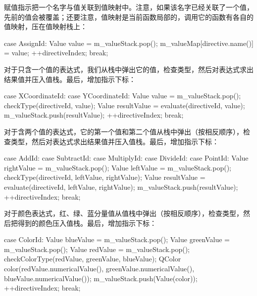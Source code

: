 赋值指示把一个名字与值关联到值映射中。注意，如果该名字已经关联了一个值，先前的值会被覆盖；还要注意，值映射是当前函数局部的，调用它的函数有各自的值映射，压在值映射栈上：

\begin{codebox}
      case AssignId: {
          Value value = m_valueStack.pop();
          m_valueMap[directive.name()] = value;
          ++directiveIndex;
        }
        break;
\end{codebox}

对于只含一个值的表达式，我们从栈中弹出它的值，检查类型，然后对表达式求出结果值并压入值栈。最后，增加指示下标：

\begin{codebox}
      case XCoordinateId:
      case YCoordinateId: {
          Value value = m_valueStack.pop();
          checkType(directiveId, value);
          Value resultValue = evaluate(directiveId, value);
          m_valueStack.push(resultValue);
          ++directiveIndex;
        }
        break;
\end{codebox}

对于含两个值的表达式，它的第一个值和第二个值从栈中弹出（按相反顺序），检查类型，然后对表达式求出结果值并压入值栈。最后，增加指示下标：

\begin{codebox}
      case AddId:
      case SubtractId:
      case MultiplyId:
      case DivideId:
      case PointId: {
          Value rightValue = m_valueStack.pop();
          Value leftValue = m_valueStack.pop();
          checkType(directiveId, leftValue, rightValue);
          Value resultValue =
            evaluate(directiveId, leftValue, rightValue);
          m_valueStack.push(resultValue);
          ++directiveIndex;
        }
        break;
\end{codebox}

对于颜色表达式，红、绿、蓝分量值从值栈中弹出（按相反顺序），检查类型，然后把得到的颜色压入值栈。最后，增加指示下标：

\begin{codebox}
      case ColorId: {
          Value blueValue = m_valueStack.pop();
          Value greenValue = m_valueStack.pop();
          Value redValue = m_valueStack.pop();
          checkColorType(redValue, greenValue, blueValue);
          QColor color(redValue.numericalValue(),
                       greenValue.numericalValue(),
                       blueValue.numericalValue());
          m_valueStack.push(Value(color));
          ++directiveIndex;
        }
        break;
\end{codebox}

